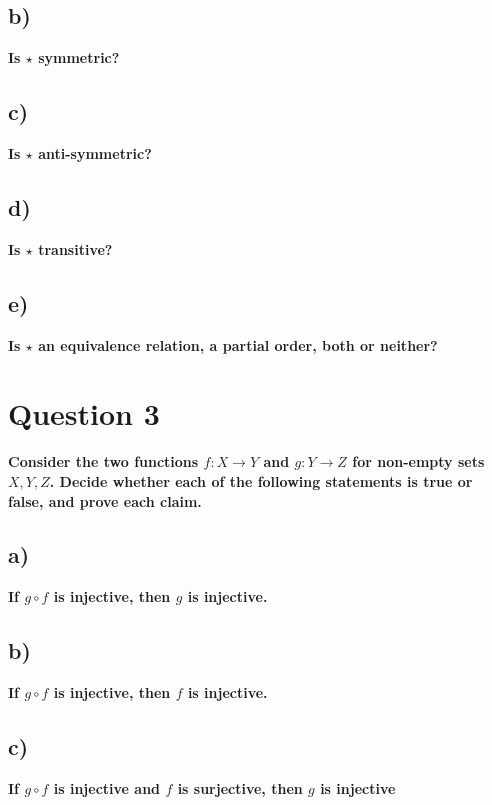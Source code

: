 \documentclass{article}
\begin{document}
\subsection{b)}
\textbf{Is $\star $ symmetric?}
\newpage
\subsection{c)}
\textbf{Is $\star $ anti-symmetric? }
\newpage
\subsection{d)}
\textbf{ Is $\star $ transitive?}
\newpage
\subsection{e)}
\textbf{ Is $\star $ an equivalence relation, a partial order, both or neither?}
\newpage
\section{Question 3}
\textbf{ Consider the two functions $f: X \rightarrow Y$ and $g: Y \rightarrow Z$ for non-empty sets $X, Y, Z$.
Decide whether each of the following statements is true or false, and prove each claim.}
\subsection{a)}
\textbf{ If $g \circ f$ is injective, then $g$ is injective.}
\newpage
\subsection{b)}
\textbf{ If $g \circ f$ is injective, then $f$ is injective. }
\newpage
\subsection{c)}
\textbf{ If $g \circ f$ is injective and $f$ is surjective, then $g$ is injective}
\end{document}

